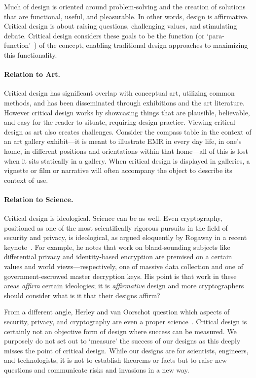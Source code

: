 Much of design is oriented around problem-solving and the creation of solutions that are functional, useful, and pleasurable. In other words, design is affirmative. Critical design is about raising questions, challenging values, and stimulating debate. Critical design considers these goals to be the function (or `para-function'~\cite{Dun05}) of the concept, enabling traditional design approaches to maximizing this functionality. 


\paragraph{Relation to Art.} 

Critical design has significant overlap with conceptual art, utilizing common methods, and has been disseminated through exhibitions and the art literature. However critical design works by showcasing things that are plausible, believable, and easy for the reader to situate, requiring design practice. Viewing critical design as art also creates challenges. Consider the compass table in the context of an art gallery exhibit---it is meant to illustrate EMR in every day life, in one's home, in different positions and orientations within that home---all of this is lost when it sits statically in a gallery. When critical design is displayed in galleries, a vignette or film or narrative will often accompany the object to describe its context of use.

\paragraph{Relation to Science.} 

Critical design is ideological. Science can be as well. Even cryptography, positioned as one of the most scientifically rigorous pursuits in the field of security and privacy, is ideological, as argued eloquently by Rogaway in a recent keynote~\cite{Rog15}. For example, he notes that work on bland-sounding subjects like differential privacy and identity-based encryption are premised on a certain values and world views---respectively, one of massive data collection and one of government-escrowed master decryption keys. His point is that work in these areas \textit{affirm} certain ideologies; it is \textit{affirmative} design and more cryptographers should consider what is it that their designs affirm?

From a different angle, Herley and van Oorschot question which aspects of security, privacy, and cryptography are even a proper science~\cite{HvO17}. Critical design is certainly not an objective form of design where success can be measured. We purposely do not set out to `measure' the success of our designs as this deeply misses the point of critical design. While our designs are for scientists, engineers, and technologists, it is not to establish theorems or facts but to raise new questions and communicate risks and invasions in a new way.

